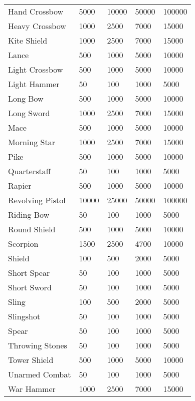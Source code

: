 \begin{longtable}{l | p{1.75cm} | p{1.75cm} | p{1.75cm} | p{1.75cm}}
	Hand Crossbow & 5000 & 10000 & 50000 & 100000\\
	
	Heavy Crossbow & 1000 & 2500 & 7000 & 15000 \\
	
	Kite Shield & 1000 & 2500 & 7000 & 15000 \\
	
	Lance & 500 & 1000 & 5000 & 10000\\
	
	Light Crossbow & 500 & 1000 & 5000 & 10000\\
	
	Light Hammer & 50 & 100 & 1000 & 5000\\
	
	Long Bow & 500 & 1000 & 5000 & 10000\\
	
	Long Sword & 1000 & 2500 & 7000 & 15000 \\
	
	Mace & 500 & 1000 & 5000 & 10000\\
	
	Morning Star & 1000 & 2500 & 7000 & 15000 \\
	
	Pike & 500 & 1000 & 5000 & 10000\\
	
	Quarterstaff & 50 & 100 & 1000 & 5000\\
	
	Rapier & 500 & 1000 & 5000 & 10000\\
	
	Revolving Pistol & 10000 & 25000 & 50000 & 100000\\
	
	Riding Bow & 50 & 100 & 1000 & 5000\\
	
	Round Shield & 500 & 1000 & 5000 & 10000\\
	
	Scorpion & 1500 & 2500 & 4700 & 10000 \\
	
	Shield & 100 & 500 & 2000 & 5000\\
	
	Short Spear & 50 & 100 & 1000 & 5000\\
	
	Short Sword & 50 & 100 & 1000 & 5000\\
	
	Sling & 100 & 500 & 2000 & 5000\\
	
	Slingshot & 50 & 100 & 1000 & 5000\\
	
	Spear & 50 & 100 & 1000 & 5000\\
	
	Throwing Stones & 50 & 100 & 1000 & 5000\\
	
	Tower Shield & 500 & 1000 & 5000 & 10000\\
	
	Unarmed Combat & 50 & 100 & 1000 & 5000\\
	
	War Hammer & 1000 & 2500 & 7000 & 15000 \\
\end{longtable}